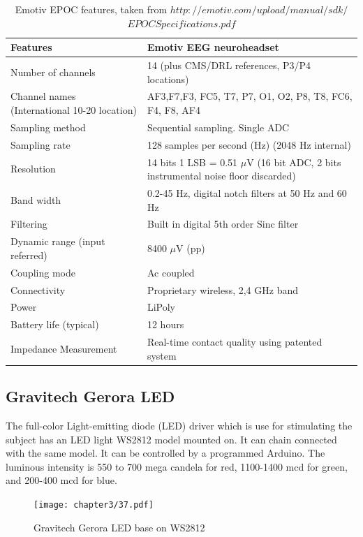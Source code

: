 \newpage
\begin{table}[ht]
\centering
\begin{tabular}{| m{.47\linewidth} | m{.47\linewidth} |}
			
			\hline 
			\textbf{Features} & \textbf{Emotiv EEG neuroheadset}  \\
			\hline 
			Number of channels & 14 (plus CMS/DRL references, P3/P4 locations)   \\
			\hline 
			Channel names (International 10-20 location)  & AF3,F7,F3, FC5, T7, P7, O1, O2, P8, T8, FC6, F4, F8, AF4  \\
			\hline 
			Sampling method & Sequential sampling. Single ADC \\
			\hline 
			Sampling rate & 128 samples per second (Hz) (2048 Hz internal) \\
			\hline
			Resolution & 14 bits 1 LSB = 0.51 $\mu$V (16 bit ADC, 2 bits instrumental noise floor discarded) \\
			\hline
			Band width & 0.2-45 Hz, digital notch filters at 50 Hz and 60 Hz\\
			\hline
			Filtering & Built in digital 5th order Sinc filter\\
            \hline
			Dynamic range (input referred) & 8400 $\mu$V (pp)\\
            \hline
			Coupling mode & Ac coupled\\
            \hline
			Connectivity & Proprietary wireless, 2,4 GHz band\\
            \hline
			Power & LiPoly \\
            \hline
			Battery life (typical) & 12 hours \\
            \hline
			Impedance Measurement & Real-time contact quality using patented system \\
		\end{tabular}
        
\caption{Emotiv EPOC features, taken from \textbf{$http://emotiv.com/upload/manual/sdk/$
$EPOCSpecifications.pdf$}}
\label{table:1}
\end{table}

\newpage
\subsection{Gravitech Gerora LED\cite{ref13}}

\hspace{1.5cm} The full-color Light-emitting diode (LED) driver which is use for stimulating the subject has an LED light WS2812 model mounted on. It can chain connected with the same model. It can be controlled by a programmed Arduino. The luminous intensity is 550 to 700 mega candela for red, 1100-1400 mcd for green, and 200-400 mcd for blue.
\begin{figure}[ht]
	\centering
	\texttt{[image: chapter3/37.pdf]}
	\caption{Gravitech Gerora LED base on WS2812}
\end{figure}
